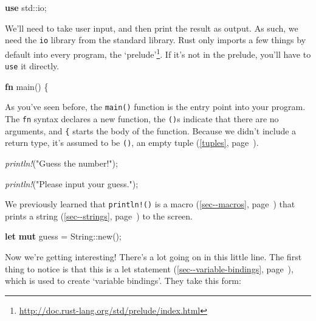 \documentclass[a4paper,]{book}
\renewcommand*{\hyperref}[2][\ar]{%
  \def\ar{#2}%
  #2 (\autoref{#1}, page~\pageref{#1})}
\newenvironment{Shaded}{\begin{snugshade}}{\end{snugshade}}
\newcommand{\KeywordTok}[1]{\textcolor[rgb]{0.13,0.29,0.53}{\textbf{{#1}}}}
\newcommand{\DataTypeTok}[1]{\textcolor[rgb]{0.13,0.29,0.53}{{#1}}}
\newcommand{\StringTok}[1]{\textcolor[rgb]{0.31,0.60,0.02}{{#1}}}
\newcommand{\PreprocessorTok}[1]{\textcolor[rgb]{0.56,0.35,0.01}{\textit{{#1}}}}
\newcommand{\NormalTok}[1]{{#1}}
\renewcommand{\href}[2]{#2\footnote{\url{#1}}}
\begin{document}
\begin{Shaded}
\begin{Highlighting}[]
\KeywordTok{use} \NormalTok{std::io;}
\end{Highlighting}
\end{Shaded}

We'll need to take user input, and then print the result as output. As
such, we need the \texttt{io} library from the standard library. Rust
only imports a few things by default into every program,
\href{http://doc.rust-lang.org/std/prelude/index.html}{the `prelude'}.
If it's not in the prelude, you'll have to \texttt{use} it directly.

\begin{Shaded}
\begin{Highlighting}[]
\KeywordTok{fn} \NormalTok{main() \{}
\end{Highlighting}
\end{Shaded}

As you've seen before, the \texttt{main()} function is the entry point
into your program. The \texttt{fn} syntax declares a new function, the
\texttt{()}s indicate that there are no arguments, and \texttt{\{}
starts the body of the function. Because we didn't include a return
type, it's assumed to be \texttt{()}, an empty \hyperref[tuples]{tuple}.

\begin{Shaded}
\begin{Highlighting}[]
    \PreprocessorTok{println!}\NormalTok{(}\StringTok{"Guess the number!"}\NormalTok{);}

    \PreprocessorTok{println!}\NormalTok{(}\StringTok{"Please input your guess."}\NormalTok{);}
\end{Highlighting}
\end{Shaded}

We previously learned that \texttt{println!()} is a
\hyperref[sec--macros]{macro} that prints a
\hyperref[sec--strings]{string} to the screen.

\begin{Shaded}
\begin{Highlighting}[]
    \KeywordTok{let} \KeywordTok{mut} \NormalTok{guess = }\DataTypeTok{String}\NormalTok{::new();}
\end{Highlighting}
\end{Shaded}

Now we're getting interesting! There's a lot going on in this little
line. The first thing to notice is that this is a
\hyperref[sec--variable-bindings]{let statement}, which is used to
create `variable bindings'. They take this form:
\end{document}
